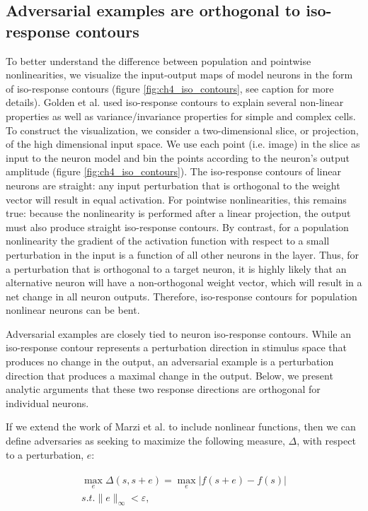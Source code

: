 \subsection{Adversarial examples are orthogonal to iso-response contours}
To better understand the difference between population and pointwise nonlinearities, we visualize the input-output maps of model neurons in the form of iso-response contours (figure \ref{fig:ch4_iso_contours}, see caption for more details). Golden et al. \citeyearpar{golden2016conjectures} used iso-response contours to explain several non-linear properties as well as variance/invariance properties for simple and complex cells. To construct the visualization, we consider a two-dimensional slice, or projection, of the high dimensional input space. We use each point (i.e. image) in the slice as input to the neuron model and bin the points according to the neuron's output amplitude (figure \ref{fig:ch4_iso_contours}). The iso-response contours of linear neurons are straight: any input perturbation that is orthogonal to the weight vector will result in equal activation. For pointwise nonlinearities, this remains true: because the nonlinearity is performed after a linear projection, the output must also produce straight iso-response contours. By contrast, for a population nonlinearity the gradient of the activation function with respect to a small perturbation in the input is a function of all other neurons in the layer. Thus, for a perturbation that is orthogonal to a target neuron, it is highly likely that an alternative neuron will have a non-orthogonal weight vector, which will result in a net change in all neuron outputs. Therefore, iso-response contours for population nonlinear neurons can be bent.

Adversarial examples are closely tied to neuron iso-response contours. While an iso-response contour represents a perturbation direction in stimulus space that produces no change in the output, an adversarial example is a perturbation direction that produces a maximal change in the output. Below, we present analytic arguments that these two response directions are orthogonal for individual neurons.

If we extend the work of Marzi et al. \citeyearpar{marzi2018sparsity} to include nonlinear functions, then we can define adversaries as seeking to maximize the following measure, $\Delta$, with respect to a perturbation, $e$:

\begin{align}\label{eq:ch4_adv_metric}
\begin{split}
    \max_{e} \Delta (s, s+e) = \max_{e} |f(s+e) - f(s)| \\
    s.t. \|e\|_{\infty} < \varepsilon,
\end{split}
\end{align}

